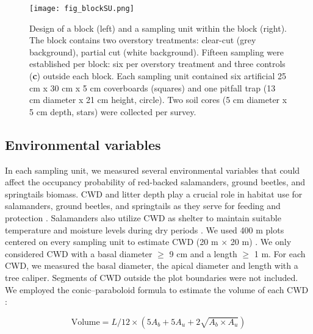 \pagebreak

\begin{figure}[ht]
	\centering
	\texttt{[image: fig\_blockSU.png]}
	\caption[Design of one block and one sampling unit with three sampling methods.]{
  Design of a block (left) and a sampling unit within the block (right). 
  The block contains two overstory treatments: clear-cut (grey background), partial cut (white background). 
  Fifteen sampling were established per block: six per overstory treatment and three controls (\textbf{c}) outside each block.
  Each sampling unit contained six artificial 25 cm x 30 cm x 5 cm coverboards (squares) and one pitfall trap (13 cm diameter x 21 cm height, circle). 
  Two soil cores (5 cm diameter x 5 cm depth, stars) were collected per survey.
  }
	\label{fig:blockSU}
	\end{figure}  

\vspace{0.5cm}

\subsection*{Environmental variables}
\label{subsec:Envar}

In each sampling unit, we measured several environmental variables that could affect the occupancy probability of red-backed salamanders, ground beetles, and springtails biomass.
CWD and litter depth play a crucial role in habitat use for salamanders, ground beetles, and springtails as
they serve for feeding and protection \citep{harmonEcologyCoarseWoody1986,koivula.LeafLitterSmallscale1999,birdChangesSoilLitter2004,McKenny2006Effectsstructural}. 
Salamanders also utilize CWD as shelter to maintain suitable temperature and moisture levels during dry periods \citep{Jaeger1980MicrohabitatsTerrestrial,groverInfluenceCoverMoisture1998a,patrickEffectsExperimentalForestry2006a}.
We used 400 m plots centered on every sampling unit to estimate CWD (20 m $\times$  20 m) \citep{methotGuideInventaireEchantillonnage2014}. 
We only considered CWD with a basal diameter $\geq$ 9 cm and a length $\geq$ 1 m.
For each CWD, we measured the basal diameter, the apical diameter and length with a tree caliper.
Segments of CWD outside the plot boundaries were not included.
We employed the conic–paraboloid formula to estimate the volume of each CWD \citep{fraverRefiningVolumeEstimates2007} :

\begin{equation}
  \text{Volume} = L/12 \times (5A_b + 5A_u + 2\sqrt{A_b \times A_u})
\end{equation}

